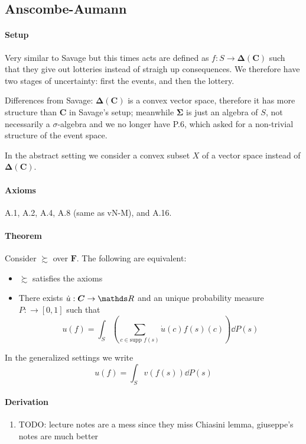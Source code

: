 \documentclass[landscape, 12pt]{extarticle}
\begin{document}
\begin{multicols}{2}
	\subsection{Anscombe-Aumann}

	\paragraph{Setup}
	Very similar to Savage
	but this times acts are defined as $f: S \to \bm \Delta(\bm C)$
	such that they give out lotteries instead of straigh up consequences.
	We therefore have two stages of uncertainty: first the events, and then the lottery.

	Differences from Savage: $\bm \Delta(\bm C)$ is a convex vector space,
	therefore it has more structure than $\bm C$ in Savage's setup;
	meanwhile $\bm \Sigma$ is just an algebra	of $S$, not necessarily a $\sigma$-algebra
	and we no longer have P.6, which asked for a non-trivial structure of the event space.

	In the abstract setting we consider a convex subset $X$ of a vector space
	instead of $\bm \Delta(\bm C)$.

	\paragraph{Axioms} A.1, A.2, A.4, A.8 (same as vN-M), and A.16.

	\paragraph{Theorem}
	Consider $\succsim$ over $\bm F$.
	The following are equivalent:
	\begin{itemize}
		\item $\succsim$ satisfies the axioms
		\item There exists $\dot u: \bm C \to \R$ and an unique probability measure $P: \bm \to [0, 1]$
		      such that
		      \[
			      u(f) = \int_S \left( \sum_{c\in \text{supp } f(s)} \dot u(c) f(s)(c) \right) \dd P(s)
		      \]
	\end{itemize}
	In the generalized settings we write
	\[
		u(f) = \int_S v(f(s))\dd P(s)
	\]

	\paragraph{Derivation}
	\begin{enumerate}
		\item TODO: lecture notes are a mess since they miss Chiasini lemma,
		      giuseppe's notes are much better
	\end{enumerate}


\end{multicols}
\end{document}
